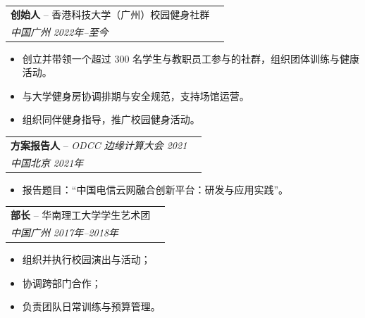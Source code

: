 \noindent
\begin{tabularx}{\textwidth}{@{}Xr@{}}
\textbf{创始人} -- 香港科技大学（广州）校园健身社群  \\
\textit{中国广州} \hfill \textit{2022年--至今}
\end{tabularx}
\begin{itemize}[leftmargin=*]
  \item 创立并带领一个超过 300 名学生与教职员工参与的社群，组织团体训练与健康活动。
  \item 与大学健身房协调排期与安全规范，支持场馆运营。
  \item 组织同伴健身指导，推广校园健身活动。
\end{itemize}

\noindent
\begin{tabularx}{\textwidth}{@{}Xr@{}}
\textbf{方案报告人} -- \textit{ODCC 边缘计算大会 2021} \\
\textit{中国北京} \hfill \textit{2021年}
\end{tabularx}
\begin{itemize}[leftmargin=*]
  \item 报告题目：“中国电信云网融合创新平台：研发与应用实践”。
\end{itemize}

\noindent
\begin{tabularx}{\textwidth}{@{}Xr@{}}
\textbf{部长} -- 华南理工大学学生艺术团\\
\textit{中国广州}  \hfill \textit{2017年--2018年}
\end{tabularx}
\begin{itemize}[leftmargin=*]
  \item 组织并执行校园演出与活动；
  \item 协调跨部门合作；
  \item 负责团队日常训练与预算管理。
\end{itemize}

